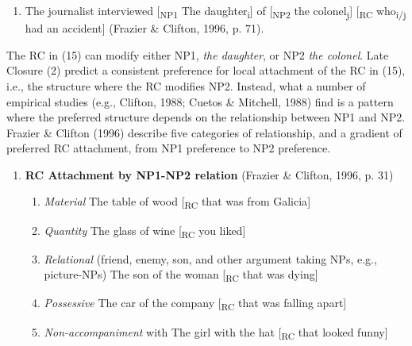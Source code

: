\documentclass[12pt,oneside]{book}
\providecommand{\tightlist}{%
  \setlength{\itemsep}{0pt}\setlength{\parskip}{0pt}}
\begin{document}
\begin{enumerate}
\def\labelenumi{(\arabic{enumi})}
\setcounter{enumi}{14}
\tightlist
\item
  The journalist interviewed {[}\textsubscript{NP1} The daughter\textsubscript{i}{]} of {[}\textsubscript{NP2} the colonel\textsubscript{j}{]} {[}\textsubscript{RC} who\textsubscript{i/j} had an accident{]} (Frazier \& Clifton, 1996, p. 71).
\end{enumerate}

The RC in (15) can modify either NP1, \emph{the daughter}, or NP2 \emph{the colonel}.  Late Closure (2)\added{)} predict a consistent preference for local attachment of the RC in (15), i.e., the structure where the RC modifies NP2.  Instead, what a number of empirical studies (e.g., Clifton, 1988; Cuetos \& Mitchell, 1988) find is a pattern where the preferred structure depends on the relationship between NP1 and NP2. Frazier \& Clifton (1996) describe five categories of relationship, and a gradient of preferred RC attachment, from NP1 preference to NP2 preference.

\begin{enumerate}
\def\labelenumi{(\arabic{enumi})}
\setcounter{enumi}{15}
\tightlist
\item
  \textbf{RC Attachment by NP1-NP2 relation} (Frazier \& Clifton, 1996, p. 31)

  \begin{enumerate}
  \def\labelenumii{\alph{enumii})}
  \tightlist
  \item
    \emph{Material} \linebreak
    The table of wood {[}\textsubscript{RC} that was from Galicia{]}
  \item
    \emph{Quantity} \linebreak
    The glass of wine {[}\textsubscript{RC} you liked{]}
  \item
    \emph{Relational} (friend, enemy, son, and other argument taking NPs, e.g., picture-NPs) \linebreak
    The son of the woman {[}\textsubscript{RC} that was dying{]}
  \item
    \emph{Possessive} \linebreak
    The car of the company {[}\textsubscript{RC} that was falling apart{]}
  \item
    \emph{Non-accompaniment} with \linebreak
    The girl with the hat {[}\textsubscript{RC} that looked funny{]}
  \end{enumerate}
\end{enumerate}
\end{document}
